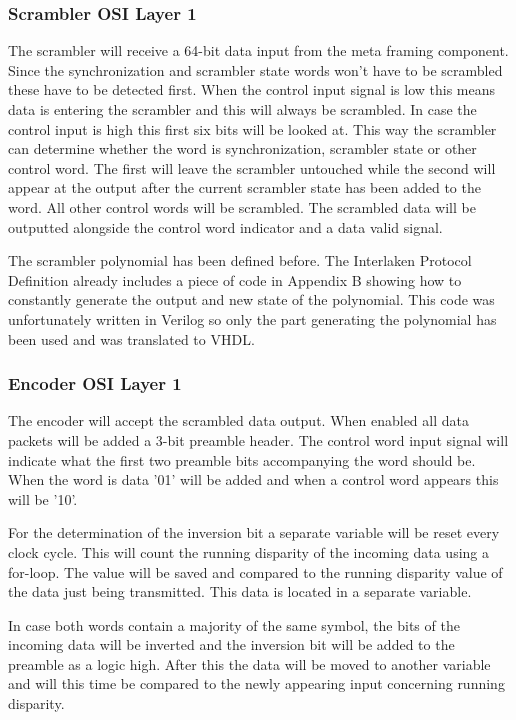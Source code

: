 	\subsubsection[Scrambler]{Scrambler \hfill OSI Layer 1}
		The scrambler will receive a 64-bit data input from the meta framing component. Since the synchronization and scrambler state words won't have to be scrambled these have to be detected first. When the control input signal is low this means data is entering the scrambler and this will always be scrambled. In case the control input is high this first six bits will be looked at. This way the scrambler can determine whether the word is synchronization, scrambler state or other control word. The first will leave the scrambler untouched while the second will appear at the output after the current scrambler state has been added to the word. All other control words will be scrambled. The scrambled data will be outputted alongside the control word indicator and a data valid signal.
		
		The scrambler polynomial has been defined before. The Interlaken Protocol Definition already includes a piece of code in Appendix B showing how to constantly generate the output and new state of the polynomial. This code was unfortunately written in Verilog so only the part generating the polynomial has been used and was translated to VHDL.

	\subsubsection[Encoder]{Encoder \hfill OSI Layer 1}
		The encoder will accept the scrambled data output. When enabled all data packets will be added a 3-bit preamble header. The control word input signal will indicate what the first two preamble bits accompanying the word should be. When the word is data '01' will be added and when a control word appears this will be '10'.
		
		For the determination of the inversion bit a separate variable will be reset every clock cycle. This will count the running disparity of the incoming data using a for-loop. The value will be saved and compared to the running disparity value of the data just being transmitted. This data is located in a separate variable. 
		
		In case both words contain a majority of the same symbol, the bits of the incoming data will be inverted and the inversion bit will be added to the preamble as a logic high. After this the data will be moved to another variable and will this time be compared to the newly appearing input concerning running disparity.
		
